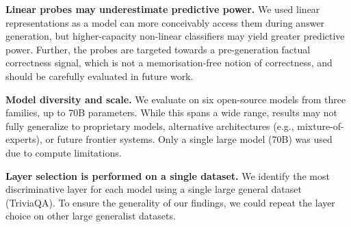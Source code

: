 \documentclass{article} %
\begin{document}
\textbf{Linear probes may underestimate predictive power.} We used linear representations as a model can more conceivably access them during answer generation, but higher-capacity non-linear classifiers may yield greater predictive power. Further, the probes are targeted towards a pre-generation factual correctness signal, which is not a memorisation-free notion of correctness, and should be carefully evaluated in future work.

\textbf{Model diversity and scale.} We evaluate on six open-source models from three families, up to 70B parameters. While this spans a wide range, results may not fully generalize to proprietary models, alternative architectures (e.g., mixture-of-experts), or future frontier systems. Only a single large model (70B) was used due to compute limitations.

\textbf{Layer selection is performed on a single dataset.} We identify the most discriminative layer for each model using a single large general dataset (TriviaQA). To ensure the generality of our findings, we could repeat the layer choice on other large generalist datasets.

\end{document}
